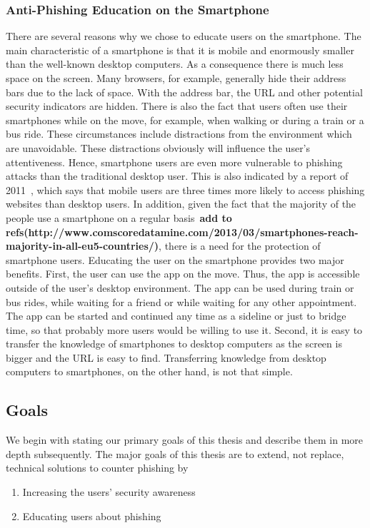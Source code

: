 \subsubsection{Anti-Phishing Education on the Smartphone}
\label{s:antiphishing_on_smartphone}
There are several reasons why we chose to educate users on the smartphone. The main characteristic of a smartphone is that it is mobile and enormously smaller than the well-known desktop computers. As a consequence there is much less space on the screen. Many browsers, for example, generally hide their address bars due to the lack of space. With the address bar, the URL and other potential security indicators are hidden. There is also the fact that users often use their smartphones while on the move, for example, when walking or  during a train or a bus ride. These circumstances include distractions from the environment which are unavoidable. These distractions obviously will influence the user's attentiveness. Hence, smartphone users are even more vulnerable to phishing attacks than the traditional desktop user. This is also indicated by a report of 2011~\cite{trusteer2011}, which says that mobile users are three times more likely to access phishing websites than desktop users. In addition, given the fact that the majority of the people use a smartphone on a regular basis~\textbf{add to refs(http://www.comscoredatamine.com/2013/03/smartphones-reach-majority-in-all-eu5-countries/)}, there is a need for the protection of smartphone users. Educating the user on the smartphone provides two major benefits. First, the user can use the app on the move. Thus, the app is accessible outside of the user's desktop environment. The app can be used during train or bus rides, while waiting for a friend or while waiting for any other appointment. The app can be started and continued any time as a sideline or just to bridge time, so that probably more users would be willing to use it. Second, it is easy to transfer the knowledge of smartphones to desktop computers as the screen is bigger and the URL is easy to find. Transferring knowledge from desktop computers to smartphones, on the other hand, is not that simple.

\subsection{Goals}
\label{s:goals}
We begin with stating our primary goals of this thesis and describe them in more depth subsequently. The major goals of this thesis are to extend, not replace, technical solutions to counter phishing by
\begin{enumerate}
	\item Increasing the users' security awareness
	\item Educating users about phishing 
\end{enumerate}

